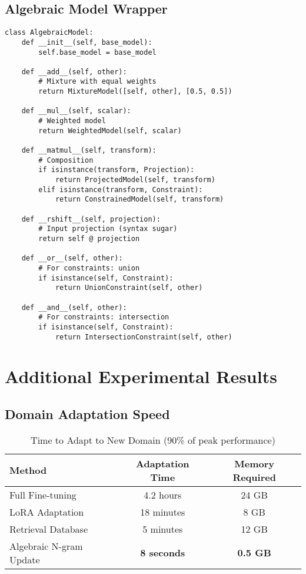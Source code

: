 \documentclass{article}
\theoremstyle{definition}
\begin{document}
\subsection{Algebraic Model Wrapper}

\begin{lstlisting}
class AlgebraicModel:
    def __init__(self, base_model):
        self.base_model = base_model

    def __add__(self, other):
        # Mixture with equal weights
        return MixtureModel([self, other], [0.5, 0.5])

    def __mul__(self, scalar):
        # Weighted model
        return WeightedModel(self, scalar)

    def __matmul__(self, transform):
        # Composition
        if isinstance(transform, Projection):
            return ProjectedModel(self, transform)
        elif isinstance(transform, Constraint):
            return ConstrainedModel(self, transform)

    def __rshift__(self, projection):
        # Input projection (syntax sugar)
        return self @ projection

    def __or__(self, other):
        # For constraints: union
        if isinstance(self, Constraint):
            return UnionConstraint(self, other)

    def __and__(self, other):
        # For constraints: intersection
        if isinstance(self, Constraint):
            return IntersectionConstraint(self, other)
\end{lstlisting}

\section{Additional Experimental Results}

\subsection{Domain Adaptation Speed}

\begin{table}[h]
\centering
\caption{Time to Adapt to New Domain (90\% of peak performance)}
\begin{tabular}{lcc}
\toprule
Method & Adaptation Time & Memory Required \\
\midrule
Full Fine-tuning & 4.2 hours & 24 GB \\
LoRA Adaptation & 18 minutes & 8 GB \\
Retrieval Database & 5 minutes & 12 GB \\
Algebraic N-gram Update & \textbf{8 seconds} & \textbf{0.5 GB} \\
\bottomrule
\end{tabular}
\end{table}
\end{document}
